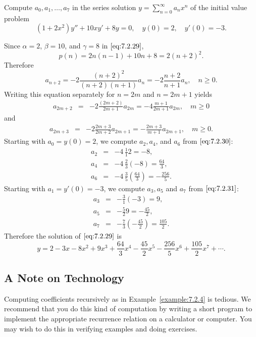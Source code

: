 \documentclass{ximera}
\begin{document}
\begin{example}\label{example:7.2.4}
Compute  $a_0, a_1, \dots, a_7$  in the series solution
$y=\sum_{n=0}^\infty a_nx^n$ of the initial value problem
\begin{equation}\label{eq:7.2.29}
(1+2x^2)y''+10xy'+8y=0,\quad y(0)=2,\quad y'(0)=-3.
\end{equation}
\begin{explanation}
Since $\alpha=2$, $\beta=10$, and $\gamma=8$ in $\eqref{eq:7.2.29}$,
$$
p(n)=2n(n-1)+10n+8=2(n+2)^2.
$$
 Therefore
$$
a_{n+2}=-2\frac{(n+2)^2}{(n+2)(n+1)}a_n=-2\frac{n+2}{n+1}a_n,\quad n\geq0.
$$
Writing this equation separately for $n=2m$  and $n=2m+1$ yields
\begin{eqnarray}
a_{2m+2}&=&-2\frac{(2m+2)}{2m+1}a_{2m}=-4\frac{m+1}{2m+1}a_{2m},\quad m\geq
0\label{eq:7.2.30}
\end{eqnarray}
and
\begin{eqnarray}
a_{2m+3}&=&-2\frac{2m+3}{2m+2}a_{2m+1}=-\frac{2m+3}{m+1}a_{2m+1},\quad m\geq0.
\label{eq:7.2.31}
\end{eqnarray}
Starting with  $a_0=y(0)=2$, we compute $a_2, a_4$, and $a_6$ from
$\eqref{eq:7.2.30}$:
\begin{eqnarray*}
a_2&=&-4\,\frac{1}{1}2=-8,\\
a_4&=&-4\,\frac{2}{3}(-8)=\frac{64}{3},\\
a_6&=&-4\,\frac{3}{5}\left(\frac{64}{3}\right)=-\frac{256}{5}.
\end{eqnarray*}
Starting with $a_1=y'(0)=-3$, we compute $a_3,a_5$ and $a_7$ from
$\eqref{eq:7.2.31}$:
\begin{eqnarray*}
a_3&=&-\frac{3}{1}(-3)=9,\\
a_5&=&-\frac{5}{2}9=-\frac{45}{2},\\
a_7&=&-\frac{7}{3}\left(-\frac{45}{2}\right)=\frac{105}{2}.
\end{eqnarray*}
Therefore the solution of $\eqref{eq:7.2.29}$ is
$$
y=2-3x-8x^2+9x^3+\frac{64}{3}x^4-\frac{45}{2}x^5-\frac{256}{5}
x^6+\frac{105}{2}x^7+\cdots .
$$
\end{explanation}
\end{example}


\subsection*{A Note on Technology}

Computing coefficients recursively as in Example~\ref{example:7.2.4} is
tedious. We recommend that you do this kind of computation by writing
a short program to implement the appropriate recurrence relation on a
calculator or computer. You may wish to do this in
verifying examples and doing exercises. %
\end{document}
